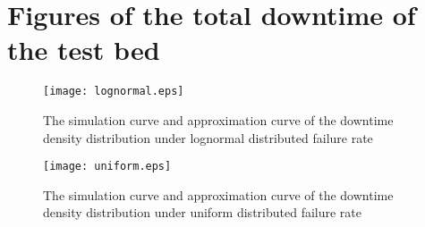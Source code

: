 \documentclass[preprint,12pt]{elsarticle}
\begin{document}
\section{Figures of the total downtime of the test bed}

\begin{figure}
\centering
\texttt{[image: lognormal.eps]}
 \caption{The simulation curve and approximation curve of the downtime density distribution under lognormal distributed failure rate}
 \label{fig:lognormal}
\end{figure}


\begin{figure}
\centering
\texttt{[image: uniform.eps]}
 \caption{The simulation curve and approximation curve of the downtime density distribution under uniform distributed failure rate}
  \label{fig:uniform}
\end{figure}
\end{document}

